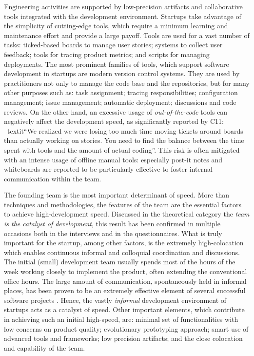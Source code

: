 \documentclass[10pt,journal,letterpaper,compsoc]{IEEEtran}
\begin{document}
\begin{compactitem}
\item Engineering activities are supported by low-precision artifacts and collaborative tools integrated with the development environment. Startups take advantage of the simplicity of cutting-edge tools, which require a minimum learning and maintenance effort and provide a large payoff.  Tools are used for a vast number of tasks: ticked-based boards to manage user stories; systems to collect user feedback; tools for tracing product metrics; and scripts for managing deployments. The most prominent families of tools, which support software development in startups are modern version control systems. They are used by practitioners not only to manage the code base and the repositories, but for many other purposes such as: task assignment; tracing responsibilities; configuration management; issue management; automatic deployment; discussions and code reviews.  On the other hand, an excessive usage of  \textit{out-of-the-code} tools can negatively affect the development speed, as significantly reported by C11: \
textit{``We realized we were losing too much time moving tickets around boards than actually working on stories. You need to find the balance between the time spent with tools and the amount of actual coding''}. This risk is often mitigated with an intense usage of offline manual tools: especially post-it notes and whiteboards are reported to be particularly effective to foster internal communication within the team. 

\item The founding team is the most important determinant of speed. More than techniques and methodologies, the features of the team are the essential factors to achieve high-development speed. Discussed in the theoretical category the \textit{team is the catalyst of development}, this result has been confirmed in multiple occasions both in the interviews and in the questionnaires. What is truly important for the startup, among other factors, is the extremely high-colocation which enables continuous informal and colloquial coordination and discussions. The initial (small) development team usually spends most of the hours of the week working closely to implement the product, often extending the conventional office hours.  The large amount of communication, spontaneously held in informal places, has been proven to be an extremely effective element of several successful software projects \cite{Highsmith2000}. Hence, the vastly \textit{informal} development environment of startups acts as a catalyst of speed. 
Other important elements, which contribute in achieving such an initial high-speed, are: minimal set of functionalities with low concerns on product quality; evolutionary prototyping approach; smart use of advanced tools and frameworks; low precision artifacts; and the close colocation and capability of the team.


\end{compactitem}
\end{document}
